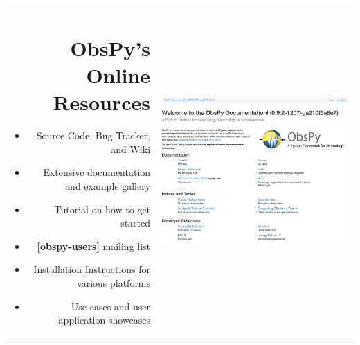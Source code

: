 \small


    \begin{center}
    \begin{tabularx}{\textwidth}{rX}
        \begin{minipage}{0.6\columnwidth}
\section*{ObsPy's Online Resources}
            \begin{itemize}
                \item Source Code, Bug Tracker, and Wiki
                \item Extensive documentation and example gallery
                \item Tutorial on how to get started
                \item \textbf{[obspy-users]} mailing list
                \item Installation Instructions for various platforms
                \item Use cases and user application showcases
            \end{itemize}
        \end{minipage}
        &
        \begin{minipage}{0.4\columnwidth}
            \begin{center}
%
%
            \includegraphics[width=0.7\columnwidth]{./images/website_screeny2.png}
            \end{center}
        \end{minipage}
    \end{tabularx}
    \end{center}

